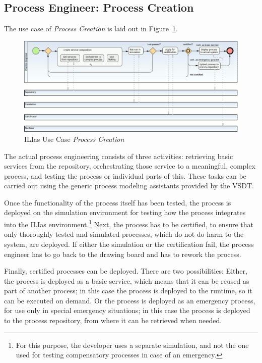 \subsection{Process Engineer: Process Creation}

The use case of \emph{Process Creation} is laid out in Figure~\ref{fig:ilias-proc-creation}.

\begin{figure}[ht]
	\centering
	\includegraphics[width=\textwidth]{ilias/bpmn_ilias-2.png}
	\caption{ILIas Use Case \emph{Process Creation}}
	\label{fig:ilias-proc-creation}
\end{figure}

The actual process engineering consists of three activities: retrieving basic
services from the repository, orchestrating those service to a meaningful, complex
process, and testing the process or individual parts of this.  These tasks can be
carried out using the generic process modeling assistants provided by the VSDT.

Once the functionality of the process itself has been tested, the process is
deployed on the simulation environment for testing how the process integrates
into the ILIas environment.\footnote{For this purpose, the developer uses a
separate simulation, and not the one used for testing compensatory processes in
case of an emergency.} Next, the process has to be certified, to ensure that only
thoroughly tested and simulated processes, which do not do harm to the system,
are deployed.  If either the simulation or the certification fail, the process
engineer has to go back to the drawing board and has to rework the process.

Finally, certified processes can be deployed.  There are two possibilities:
Either, the process is deployed as a basic service, which means that it can be
reused as part of another process; in this case the process is deployed to the
runtime, so it can be executed on demand.  Or the process is deployed as an
emergency process, for use only in special emergency situations; in this case the
process is deployed to the process repository, from where it can be retrieved
when needed.


